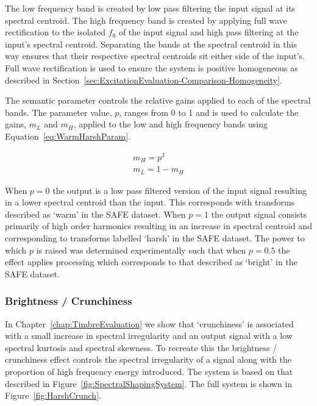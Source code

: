 			The low frequency band is created by low pass filtering the input signal at its spectral centroid.
			The high frequency band is created by applying full wave rectification to the isolated $f_{0}$ of
			the input signal and high pass filtering at the input's spectral centroid.  Separating the bands at
			the spectral centroid in this way ensures that their respective spectral centroids sit either side
			of the input's. Full wave rectification is used to ensure the system is positive homogeneous as
			described in Section~\ref{sec:ExcitationEvaluation-Comparison-Homogeneity}.

			The semantic parameter controls the relative gains applied to each of the spectral bands. The
			parameter value, $p$, ranges from 0 to 1 and is used to calculate the gains, $m_{L}$ and $m_{H}$,
			applied to the low and high frequency bands using Equation~\ref{eq:WarmHarshParam}.

			\begin{gather}
				m_{H} = p^{3} \nonumber \\
				m_{L} = 1 - m_{H}
				\label{eq:WarmHarshParam}
			\end{gather}

			When $p = 0$  the output is a low pass filtered version of the input signal resulting in a lower
			spectral centroid than the input. This corresponds with transforms described as `warm' in the SAFE
			dataset. When $p = 1$ the output signal consists primarily of high order harmonics resulting in an
			increase in spectral centroid and corresponding to transforms labelled `harsh' in the SAFE dataset.
			The power to which $p$ is raised was determined experimentally such that when $p = 0.5$ the effect
			applies processing which corresponds to that described as `bright' in the SAFE dataset. 

		\subsubsection*{Brightness / Crunchiness}
			In Chapter~\ref{chap:TimbreEvaluation} we show that `crunchiness' is associated with a small
			increase in spectral irregularity and an output signal with a low spectral kurtosis and spectral
			skewness. To recreate this the brightness / crunchiness effect controls the spectral irregularity
			of a signal along with the proportion of high frequency energy introduced.  The system is based on
			that described in Figure~\ref{fig:SpectralShapingSystem}. The full system is shown in
			Figure~\ref{fig:HarshCrunch}.

